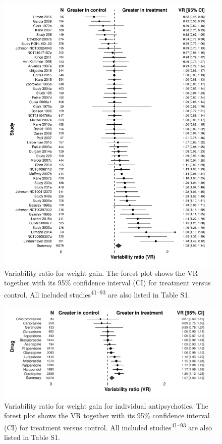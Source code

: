 \documentclass[9pt,english,,jou,floatsintext]{apa6}
\begin{document}
\begin{figure}
\centering
\includegraphics{../output/figures/weightsd_fig1.pdf}
\caption{\label{fig:fig1}Variability ratio for weight gain. The forest plot
shows the VR together with its 95\% confidence interval (CI) for
treatment versus control. All included studies\textsuperscript{41--93}
are also listed in Table S1.}
\end{figure}

\begin{figure}
\centering
\includegraphics{../output/figures/weightsd_fig2.pdf}
\caption{\label{fig:fig2}Variability ratio for weight gain for individual
antipsychotics. The forest plot shows the VR together with its 95\%
confidence interval (CI) for treatment versus control. All included
studies\textsuperscript{41--93} are also listed in Table S1.}
\end{figure}
\end{document}
